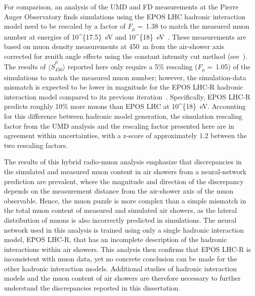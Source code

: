 For comparison, an analysis of the UMD and FD measurements at the Pierre Auger Observatory finds simulations using the EPOS LHC hadronic interaction model need to be rescaled by a factor of $F_{\mu}=$\,1.38 to match the measured muon number at energies of \qty[parse-numbers=false]{10^{17.5}}{\electronvolt} and \qty[parse-numbers=false]{10^{18}}{\electronvolt}~\cite{auger_epjc2020_muoncontent_umd}.
These measurements are based on muon density measurements at \qty{450}{\meter} from the air-shower axis corrected for zenith angle effects using the constant intensity cut method (see~).
The results of $\langle \hat{S}^{\mu}_{450}\rangle$ reported here only require a 5\% rescaling ($F_{\mu}=$\,1.05) of the simulations to match the measured muon number; however, the simulation-data mismatch is expected to be lower in magnitude for the EPOS LHC-R hadronic interaction model compared to its previous iteration~\cite{icrc2025_pierog}.
Specifically, EPOS LHC-R predicts roughly 10\% more muons than EPOS LHC at \qty[parse-numbers=false]{10^{18}}{\electronvolt}.
Accounting for this difference between hadronic model generation, the simulation rescaling factor from the UMD analysis and the rescaling factor presented here are in agreement within uncertainties, with a z-score of approximately 1.2 between the two rescaling factors.

The results of this hybrid radio-muon analysis emphasize that discrepancies in the simulated and measured muon content in air showers from a neural-network prediction are prevalent, where the magnitude and direction of the discrepancy depends on the measurement distance from the air-shower axis of the muon observable.
Hence, the muon puzzle is more complex than a simple mismatch in the total muon content of measured and simulated air showers, as the lateral distribution of muons is also incorrectly predicted in simulations.
The neural network used in this analysis is trained using only a single hadronic interaction model, EPOS LHC-R, that has an incomplete description of the hadronic interactions within air showers.
This analysis then confirms that EPOS LHC-R is inconsistent with muon data, yet no concrete conclusion can be made for the other hadronic interaction models.
Additional studies of hadronic interaction models and the muon content of air showers are therefore necessary to further understand the discrepancies reported in this dissertation. 




